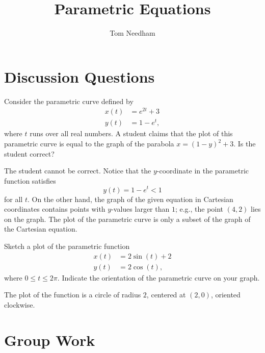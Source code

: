 \documentclass[]{ximera}
\author{Tom Needham}
\title[Collaborate:]{Parametric Equations}
\begin{document}
\begin{abstract}
\end{abstract}
\maketitle

\section{Discussion Questions}

\begin{problem}
Consider the parametric curve defined by 
\begin{align*}
x(t) &= e^{2t} + 3 \\
y(t) &= 1-e^t,
\end{align*}
where $t$ runs over all real numbers. A student claims that the plot of this parametric curve is equal to the graph of the parabola $x = (1-y)^2 + 3$. Is the student correct?
\begin{solution}
The student cannot be correct. Notice that the $y$-coordinate in the parametric function satisfies 
$$
y(t) = 1- e^t < 1
$$
for all $t$. On the other hand, the graph of the given equation in Cartesian coordinates contains points with $y$-values larger than $1$; e.g., the point $(4,2)$ lies on the graph. The plot of the parametric curve is only a subset of the graph of the Cartesian equation.
\end{solution}
\end{problem}

\begin{problem}
Sketch a plot of the parametric function
\begin{align*}
x(t) &= 2 \sin (t) +2\\
y(t) &= 2 \cos (t),
\end{align*}
where $0 \leq t \leq 2\pi$. Indicate the orientation of the parametric curve on your graph.

\begin{solution}
The plot of the function is a circle of radius $2$, centered at $(2,0)$, oriented clockwise.
\end{solution}
\end{problem}


\section{Group Work}
\end{document}
